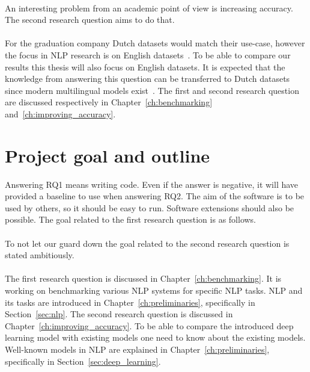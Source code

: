 \rqone \\[1mm]

An interesting problem from an academic point of view is increasing accuracy.
The second research question aims to do that.\\

\rqtwo \\[1mm]

For the graduation company Dutch datasets would match their use-case, however the focus in NLP research is on English datasets~\citep{cambria2014jumping,young2018recent}.
To be able to compare our results this thesis will also focus on English datasets.
It is expected that the knowledge from answering this question can be transferred to Dutch datasets since modern multilingual models exist~\citep{spacy2019models,subramanian2018learning,devlin2018}.
The first and second research question are discussed respectively in Chapter~\ref{ch:benchmarking} and~\ref{ch:improving_accuracy}.

\section{Project goal and outline}
\label{sec:project_goal}
Answering RQ1 means writing code.
Even if the answer is negative, it will have provided a baseline to use when answering RQ2.
The aim of the software is to be used by others, so it should be easy to run.
Software extensions should also be possible.
The goal related to the first research question is as follows.\\

\rgone \\

\noindent To not let our guard down the goal related to the second research question is stated ambitiously.\\

\rgtwo \\

The first research question is discussed in Chapter~\ref{ch:benchmarking}.
It is working on benchmarking various NLP systems for specific NLP tasks.
NLP and its tasks are introduced in Chapter~\ref{ch:preliminaries}, specifically in Section~\ref{sec:nlp}.
The second research question is discussed in Chapter~\ref{ch:improving_accuracy}.
To be able to compare the introduced deep learning model with existing models one need to know about the existing models.
Well-known models in NLP are explained in Chapter~\ref{ch:preliminaries}, specifically in Section~\ref{sec:deep_learning}.